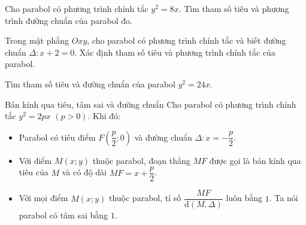 \begin{bt}
	Cho parabol có phương trình chính tắc $y^2=8x$. Tìm tham số tiêu và phương trình đường chuẩn của parabol đo.
\end{bt}
\begin{bt}
	Trong mặt phẳng $Oxy$, cho parabol có phương trình chính tắc và biết đường chuẩn $\Delta\colon x+2=0$. Xác định tham số tiêu và phương trình chính tắc của parabol.
\end{bt}
\begin{bt}
	Tìm tham số tiêu và đường chuẩn của parabol $y^2=24x$.
\end{bt}

\begin{dang}{Bán kính qua tiêu, tâm sai và đường chuẩn}
	Cho parabol có phương trình chính tắc $y^2=2px$ $(p>0)$. Khi đó:
	\begin{itemize}
		\item Parabol có tiêu điểm $F\left(\dfrac{p}{2};0\right)$ và đường chuẩn $\Delta\colon x=-\dfrac{p}{2}$.
		\item Với điểm $M(x;y)$ thuộc parabol, đoạn thẳng $MF$ được gọi là bán kính qua tiêu của $M$ và có độ dài $MF=x+\dfrac{p}{2}$.
		\item Với mọi điểm $M(x;y)$ thuộc parabol, tỉ số $\dfrac{MF}{\mathrm{d}(M,\Delta)}$ luôn bằng $1$. Ta nói parabol có tâm sai bằng $1$.
	\end{itemize}
\end{dang}

